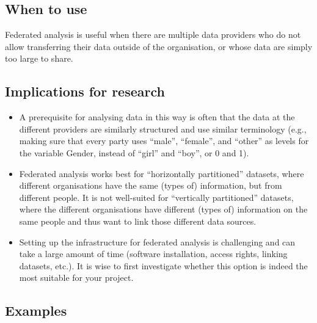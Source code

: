 \documentclass[
]{book}
\providecommand{\tightlist}{%
  \setlength{\itemsep}{0pt}\setlength{\parskip}{0pt}}
\begin{document}
\hypertarget{when-to-use-2}{%
\subsection{When to use}\label{when-to-use-2}}

Federated analysis is useful when there are multiple data providers who do not
allow transferring their data outside of the organisation, or whose data are
simply too large to share.

\hypertarget{implications-for-research-2}{%
\subsection{Implications for research}\label{implications-for-research-2}}

\begin{itemize}
\tightlist
\item
  A prerequisite for analysing data in this way is often that the data at the
  different providers are similarly structured and use similar terminology (e.g.,
  making sure that every party uses ``male'', ``female'', and ``other'' as levels for
  the variable Gender, instead of ``girl'' and ``boy'', or 0 and 1).
\item
  Federated analysis works best for ``horizontally partitioned'' datasets, where
  different organisations have the same (types of) information, but from different
  people. It is not well-suited for ``vertically partitioned'' datasets, where the
  different organisations have different (types of) information on the same people
  and thus want to link those different data sources.
\item
  Setting up the infrastructure for federated analysis is challenging and can
  take a large amount of time (software installation, access rights, linking
  datasets, etc.). It is wise to first investigate whether this option is indeed
  the most suitable for your project.
\end{itemize}

\hypertarget{examples-2}{%
\subsection{Examples}\label{examples-2}}
\end{document}

